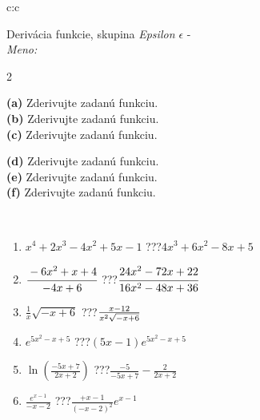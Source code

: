 \documentclass[10pt]{report}
\begin{document}
\newpage
\thispagestyle{empty}
\begin{tabular}{c:c}
\begin{minipage}[c][104.5mm][t]{0.5\linewidth}
\begin{center}
\vspace{7mm}
{\huge Derivácia funkcie, skupina \textit{Epsilon $\epsilon$} -}\\[5mm]
\textit{Meno:}\phantom{xxxxxxxxxxxxxxxxxxxxxxxxxxxxxxxxxxxxxxxxxxxxxxxxxxxxxxxxxxxxxxxxx}\\[5mm]
\begin{minipage}{0.95\linewidth}
\begin{center}
{\small \begin{multicols}{2} \raggedright
\textbf{(a)} Zderivujte zadanú funkciu. \\[1mm]
\textbf{(b)} Zderivujte zadanú funkciu. \\[1mm]
\textbf{(c)} Zderivujte zadanú funkciu. \par \columnbreak
\textbf{(d)} Zderivujte zadanú funkciu. \\[1mm]
\textbf{(e)} Zderivujte zadanú funkciu. \\[1mm]
\textbf{(f)} Zderivujte zadanú funkciu.
\end{multicols}
}
\end{center}
\end{minipage}
\\[4mm]
\begin{minipage}{0.79\linewidth}
\begin{center}
\begin{varwidth}{\linewidth}
\begin{enumerate}
\normalsize
\item $x^4+2x^3-4x^2+5x-1$\quad \dotfill\; ???\;\dotfill \quad $4x^3+6x^2-8x+5$
\item $\cfrac{-6x^2+x+4}{-4x+6}$\quad \dotfill\; ???\;\dotfill \quad $\cfrac{24x^2-72x+22}{16x^2-48x+36}$
\item $\frac{1}{x}\sqrt{-x+6}$\quad \dotfill\; ???\;\dotfill \quad $\frac{x-12}{x^2 \sqrt{\smash[b]{-x+6}}}$
\item $e^{5x^2-x+5}$\quad \dotfill\; ???\;\dotfill \quad $(5x-1)e^{5x^2-x+5}$
\item $\ln{\left(\frac{-5x+7}{2x+2}\right)}$\quad \dotfill\; ???\;\dotfill \quad $\frac{-5}{-5x+7}-\frac{2}{2x+2}$
\item $\frac{e^{x-1}}{-x-2}$\quad \dotfill\; ???\;\dotfill \quad $\frac{+x-1}{(-x-2)^2}e^{x-1}$
\end{enumerate}

\end{varwidth}
\end{center}
\end{minipage}
\end{center}
\end{minipage}
\end{tabular}
\end{document}
